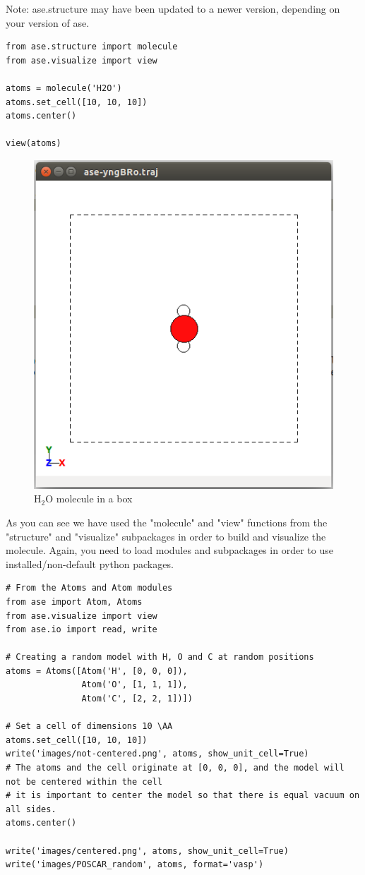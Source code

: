 \documentclass[11pt]{article}
\begin{document}
Note: ase.structure may have been updated to a newer version, depending on your version of ase.
\begin{verbatim}
from ase.structure import molecule
from ase.visualize import view

atoms = molecule('H2O')
atoms.set_cell([10, 10, 10])
atoms.center()

view(atoms)
\end{verbatim}

\begin{figure}[htb]
\centering
\includegraphics[width=.9\linewidth]{./figures/molec_h2o_ase_ex.png}
\caption{H$_{\text{2}}$O molecule in a box}
\end{figure}

As you can see we have used the "molecule" and "view" functions from the "structure" and "visualize" subpackages in order to build and visualize the molecule. Again, you need to load modules and subpackages in order to use installed/non-default python packages.

\begin{verbatim}
# From the Atoms and Atom modules
from ase import Atom, Atoms
from ase.visualize import view
from ase.io import read, write

# Creating a random model with H, O and C at random positions
atoms = Atoms([Atom('H', [0, 0, 0]),
               Atom('O', [1, 1, 1]), 
               Atom('C', [2, 2, 1])])

# Set a cell of dimensions 10 \AA
atoms.set_cell([10, 10, 10])
write('images/not-centered.png', atoms, show_unit_cell=True)
# The atoms and the cell originate at [0, 0, 0], and the model will not be centered within the cell
# it is important to center the model so that there is equal vacuum on all sides.
atoms.center()

write('images/centered.png', atoms, show_unit_cell=True)
write('images/POSCAR_random', atoms, format='vasp')
\end{verbatim}
\end{document}
